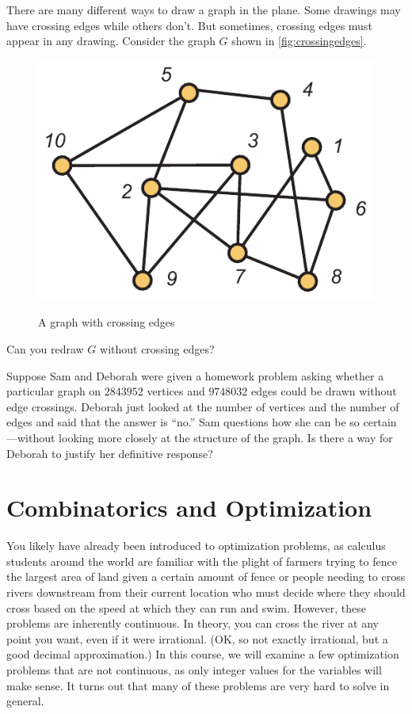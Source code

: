 \begin{example}
There are many different ways to draw a graph in the plane. Some
drawings may have crossing edges while others don't.  But sometimes, crossing
edges must appear in any drawing.
Consider the graph $G$ shown in \autoref{fig:crossingedges}.
\begin{figure}
\begin{center}
\includegraphics[scale=.6]{intro-figs/3012-fig8}\\
\end{center}
\caption{A graph with crossing edges}
\label{fig:crossingedges}
\end{figure}
Can you redraw $G$ without crossing edges?

Suppose Sam and Deborah were given a homework problem asking whether a
particular graph on $2843952$ vertices and $9748032$ edges could be
drawn without edge crossings.  Deborah just looked at the number of
vertices and the number of edges and said that the answer is ``no.''
Sam questions how she can be so certain---without looking more
closely at the structure of the graph.  Is there a way for
Deborah to justify her definitive response?
\end{example}

\section{Combinatorics and Optimization}\label{s:intro:opt}

You likely have already been introduced to optimization problems, as
calculus students around the world are familiar with the plight of
farmers trying to fence the largest area of land given a certain
amount of fence or people needing to cross rivers downstream from
their current location who must decide where they should cross based
on the speed at which they can run and swim. However, these problems
are inherently continuous. In theory, you can cross the river at any
point you want, even if it were irrational. (OK, so not exactly
irrational, but a good decimal approximation.) In this course, we will
examine a few optimization problems that are not continuous, as only
integer values for the variables will make sense. It turns out that
many of these problems are very hard to solve in general.

